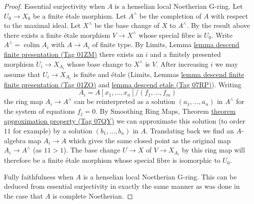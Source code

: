 \documentclass{amsart}
\theoremstyle{plain}
\theoremstyle{definition}
\theoremstyle{remark}
\numberwithin{equation}{subsection}
\def\colim{\mathop{\mathrm{colim}}\nolimits}
\begin{document}
\begin{proof}
\medskip\noindent
Essential surjectivity when $A$ is a henselian local Noetherian G-ring.
Let $U_0 \to X_0$ be a finite \'etale morphism.
Let $A^\wedge$ be the completion of $A$ with respect to the maximal ideal.
Let $X^\wedge$ be the base change of $X$ to $A^\wedge$.
By the result above there exists a finite \'etale morphism
$V \to X^\wedge$ whose special fibre is $U_0$.
Write $A^\wedge = \colim A_i$ with $A \to A_i$ of finite type.
By Limits, Lemma \href{https://stacks.math.columbia.edu/tag/01ZM}{lemma descend finite presentation (Tag 01ZM)}
there exists an $i$ and a finitely presented morphism $U_i \to X_{A_i}$
whose base change to $X^\wedge$ is $V$. After increasing $i$
we may assume that $U_i \to X_{A_i}$ is finite and \'etale
(Limits, Lemmas \href{https://stacks.math.columbia.edu/tag/01ZO}{lemma descend finite finite presentation (Tag 01ZO)} and
\href{https://stacks.math.columbia.edu/tag/07RP}{lemma descend etale (Tag 07RP)}). Writing
$$
A_i = A[x_1, \ldots, x_n]/(f_1, \ldots, f_m)
$$
the ring map $A_i \to A^\wedge$ can be reinterpreted as a solution
$(a_1, \ldots, a_n)$ in $A^\wedge$ for the system of equations $f_j = 0$.
By Smoothing Ring Maps, Theorem \href{https://stacks.math.columbia.edu/tag/07QY}{theorem approximation property (Tag 07QY)}
we can approximate this solution (to order $11$ for example) by a solution
$(b_1, \ldots, b_n)$ in $A$. Translating back we find an $A$-algebra map
$A_i \to A$ which gives the same closed point as the original map
$A_i \to A^\wedge$ (as $11 > 1$). The base change $U \to X$ of $V \to X_{A_i}$
by this ring map will therefore be a finite \'etale morphism whose
special fibre is isomorphic to $U_0$.

\medskip\noindent
Fully faithfulness when $A$ is a henselian local Noetherian G-ring.
This can be deduced from essential surjectivity in exactly the same
manner as was done in the case that $A$ is complete Noetherian.


\end{proof}
\end{document}
